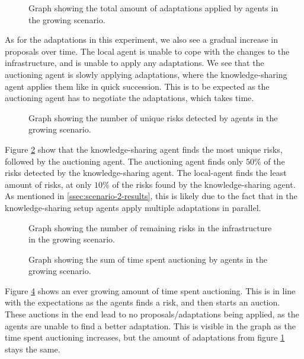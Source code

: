 \begin{figure}[H]
    \centering
    
    \caption{Graph showing the total amount of adaptations applied by agents in the growing scenario.}
    \label{fig:proposals-growing}
\end{figure}

As for the adaptations in this experiment, we also see a gradual increase in proposals over time. The local agent is unable to cope with the changes to the infrastructure, and is unable to apply any adaptations. We see that the auctioning agent is slowly applying adaptations, where the knowledge-sharing agent applies them like in quick succession. This is to be expected as the auctioning agent has to negotiate the adaptations, which takes time.

\begin{figure}[H]
    \centering
        
    \caption{Graph showing the number of unique risks detected by agents in the growing scenario.}
    \label{fig:risk-count-growing}
\end{figure}

Figure \ref{fig:risk-count-growing} show that the knowledge-sharing agent finds the most unique risks, followed by the auctioning agent. The auctioning agent finds only $50\%$ of the risks detected by the knowledge-sharing agent. The local-agent finds the least amount of risks, at only $10\%$ of the risks found by the knowledge-sharing agent. As mentioned in \ref{ssec:scenario-2-results}, this is likely due to the fact that in the knowledge-sharing setup agents apply multiple adaptations in parallel. 

\begin{figure}[H]
    \centering
        
    \caption{Graph showing the number of remaining risks in the infrastructure in the growing scenario.}
    \label{fig:risk-remaining-growing}
\end{figure}


\begin{figure}[H]
    \centering
        
    \caption{Graph showing the sum of time spent auctioning by agents in the growing scenario.}
    \label{fig:auctioning-time-growing}
\end{figure}

Figure \ref{fig:auctioning-time-growing} shows an ever growing amount of time spent auctioning. This is in line with the expectations as the agents finds a risk, and then starts an auction. These auctions in the end lead to no proposals/adaptations being applied, as the agents are unable to find a better adaptation. This is visible in the graph as the time spent auctioning increases, but the amount of adaptations from figure \ref{fig:proposals-growing} stays the same.

